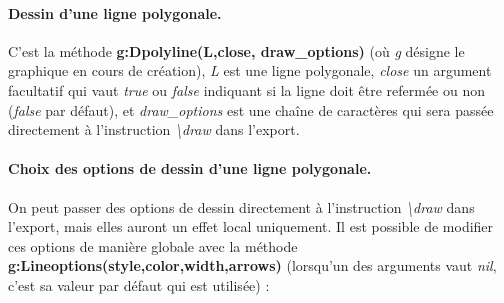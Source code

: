 \documentclass[%
10pt,%
a4paper,%
french,%
]%
{article}%
\begin{document}
\paragraph{Dessin d'une ligne polygonale.}

C'est la méthode \textbf{g:Dpolyline(L,close, draw\_options)} (où \emph{g} désigne le graphique en cours de création), \emph{L} est une ligne polygonale, \emph{close} un argument facultatif qui vaut \emph{true} ou \emph{false} indiquant si la ligne doit être refermée ou non (\emph{false} par défaut), et \emph{draw\_options} est une chaîne de caractères qui sera passée directement à l'instruction \emph{\textbackslash draw} dans l'export.

\paragraph{Choix des options de dessin d'une ligne polygonale.}

On peut passer des options de dessin directement à l'instruction \emph{\textbackslash draw} dans l'export, mais elles auront un effet local uniquement. Il est possible de modifier ces options de manière globale avec la méthode \textbf{g:Lineoptions(style,color,width,arrows)} (lorsqu'un des arguments vaut \emph{nil}, c'est sa valeur par défaut qui est utilisée) :
\end{document}
